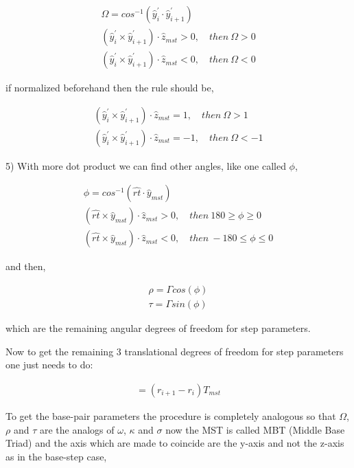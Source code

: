 \begin{gather}
\Omega = cos^{-1}(\hat{y}_{i}^{'} \cdot \hat{y}_{i+1}^{'})\\
(\hat{y}_{i}^{'} \times \hat{y}_{i+1}^{'}) \cdot \hat{z}_{mst} > 0, \quad then \ \Omega > 0\\
(\hat{y}_{i}^{'} \times \hat{y}_{i+1}^{'}) \cdot \hat{z}_{mst} < 0, \quad then \ \Omega < 0
\end{gather}

if normalized beforehand then the rule should be,

\begin{gather}
(\hat{y}_{i}^{'} \times \hat{y}_{i+1}^{'}) \cdot \hat{z}_{mst} = 1, \quad then \ \Omega > 1\\
(\hat{y}_{i}^{'} \times \hat{y}_{i+1}^{'}) \cdot \hat{z}_{mst} = -1,\quad then \ \Omega < -1
\end{gather}

5) With more dot product we can find other angles, like one called $\phi$,

\begin{gather}
\phi = cos^{-1}(\hat{rt} \cdot \hat{y}_{mst})\\
(\hat{rt} \times \hat{y}_{mst}) \cdot \hat{z}_{mst} > 0, \quad then \ 180 \geq \phi \geq 0\\
(\hat{rt} \times \hat{y}_{mst}) \cdot \hat{z}_{mst} < 0, \quad then \ -180 \leq \phi \leq 0
\end{gather}

and then, 

\begin{gather}
\rho = \Gamma cos (\phi)\\
\tau = \Gamma sin (\phi)
\end{gather}

which are the remaining angular degrees of freedom for step parameters.

Now to get the remaining 3 translational degrees of freedom for step parameters one just
needs to do:

\begin{gather}
[D_xD_yD_z]=(r_{i+1} - r_{i})T_{mst}
\end{gather}

To get the base-pair parameters the procedure is completely analogous so that
$\Omega$, $\rho$ and $\tau$ are the analogs of $\omega$, $\kappa$ and $\sigma$
now the MST is called MBT (Middle Base Triad) and the axis which are made to 
coincide are the y-axis and not the z-axis as in the base-step case,

